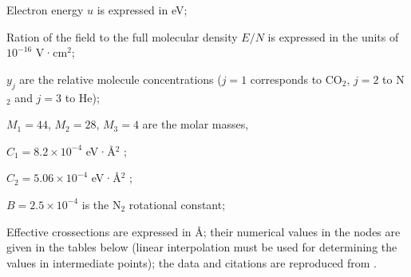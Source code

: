\documentclass{report}
\begin{document}
Electron energy $u$ is expressed in eV;

Ration of the field to the full molecular density $E/N$ is expressed in the units of $10^{-16}$ V·cm$^2$;

$y_j$ are the relative molecule concentrations ($j=1$ corresponds to CO$_2$, $j=2$ to N$_2$ and $j=3$ to He);

$M_1=44$, $M_2=28$, $M_3=4$ are the molar masses,

$C_1 = 8.2 \times 10^{-4}$ eV·Å$^2$ \cite{Hake-1967};

$C_2 = 5.06 \times 10^{-4}$ eV·Å$^2$ \cite{Frost-1962};

$B = 2.5 \times 10^{-4}$ is the N$_2$ rotational constant;

Effective crossections are expressed in Å; their numerical values in the nodes are given in the tables below (linear interpolation must be used for determining the values in intermediate points); the data and citations are reproduced from \cite{Karlov-1978}.
\end{document}
